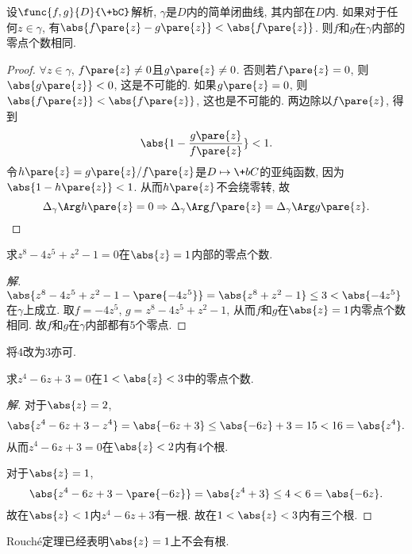 \documentclass[../ComplexVariable.tex]{subfiles}
\begin{document}
\begin{theorem}
    设$\func{f,g}{D}{\+bC}$解析, $\gamma$是$D$内的简单闭曲线, 其内部在$D$内. 如果对于任何$z\in\gamma$, 有$\abs{f\pare{z} - g\pare{z}} < \abs{f\pare{z}}$. 则$f$和$g$在$\gamma$内部的零点个数相同.
\end{theorem}
\begin{proof}
    $\forall z\in\gamma$, $f\pare{z} \neq 0$且$g\pare{z} \neq 0$. 否则若$f\pare{z} = 0$, 则$\abs{g\pare{z}}<0$, 这是不可能的. 如果$g\pare{z} = 0$, 则$\abs{f\pare{z}} < \abs{f\pare{z}}$, 这也是不可能的. 两边除以$f\pare{z}$, 得到
    \[ \abs{1 - \frac{g\pare{z}}{f\pare{z}}} < 1. \]
    令$h\pare{z} = g\pare{z}/f\pare{z}$是$D\mapsto \+bC$的亚纯函数, 因为$\abs{1-h\pare{z}} < 1$. 从而$h\pare{z}$不会绕零转, 故
    \[ \Delta_\gamma \Arg h\pare{z} = 0 \Rightarrow \Delta_\gamma \Arg f\pare{z} = \Delta_\gamma \Arg g\pare{z}. \qedhere \]
\end{proof}
\begin{sample}
    \begin{ex}
        求$z^8 - 4z^5 + z^2 - 1 = 0$在$\abs{z} = 1$内部的零点个数.
    \end{ex}
    \begin{proof}[解]
        $\abs{z^8 - 4z^5 + z^2 - 1 - \pare{-4z^5}} = \abs{z^8 + z^2 - 1} \le 3 < \abs{-4z^5}$在$\gamma$上成立. 取$f = -4z^5$, $g = z^8 - 4z^5 + z^2 - 1$, 从而$f$和$g$在$\abs{z} = 1$内零点个数相同. 故$f$和$g$在$\gamma$内部都有$5$个零点.
    \end{proof}
    \begin{remark}
        将$4$改为$3$亦可.
    \end{remark}
\end{sample}
\begin{sample}
    \begin{ex}
        求$z^4 - 6z + 3 = 0$在$1<\abs{z}<3$中的零点个数. 
    \end{ex}
    \begin{proof}[解]
        对于$\abs{z} = 2$,
        \[ \abs{z^4 - 6z + 3 - z^4} = \abs{-6z + 3} \le \abs{-6z} + 3 = 15 < 16 = \abs{z^4}. \]
        从而$z^4 - 6z + 3 = 0$在$\abs{z} < 2$内有$4$个根.
        \par
        对于$\abs{z} = 1$,
        \[ \abs{z^4 - 6z + 3 - \pare{-6z}} = \abs{z^4 + 3} \le 4 < 6 = \abs{-6z}. \]
        故在$\abs{z}<1$内$z^4 - 6z + 3$有一根. 故在$1 < \abs{z} < 3$内有三个根.
    \end{proof}
    \begin{remark}
        Rouch\'e定理已经表明$\abs{z}=1$上不会有根.
    \end{remark}
\end{sample}
\end{document}
